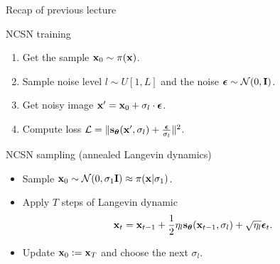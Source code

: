 \begin{frame}{Recap of previous lecture}
	\begin{block}{NCSN training}
		\begin{enumerate}
			\item Get the sample $\mathbf{x}_0 \sim \pi(\mathbf{x})$.
			\item Sample noise level $l \sim U[1, L]$ and the noise $\boldsymbol{\epsilon} \sim \mathcal{N}(0, \mathbf{I})$.
			\item Get noisy image $\mathbf{x}' = \mathbf{x}_0 + \sigma_l \cdot \boldsymbol{\epsilon}$.
			\item Compute loss $ \mathcal{L} = \| \mathbf{s}_{\boldsymbol{\theta}}(\mathbf{x}', \sigma_l) + \frac{\boldsymbol{\epsilon}}{\sigma_l} \|^2 $.
		\end{enumerate}
	\end{block}
	\begin{block}{NCSN sampling (annealed Langevin dynamics)}
		\begin{itemize}
			\item Sample $\mathbf{x}_0 \sim \mathcal{N}(0, \sigma_1 \mathbf{I}) \approx \pi(\mathbf{x} | \sigma_1)$.
			\item Apply $T$ steps of Langevin dynamic
			\vspace{-0.2cm}
			\[
				\mathbf{x}_t = \mathbf{x}_{t-1} + \frac{1}{2}\eta_l \mathbf{s}_{\boldsymbol{\theta}}(\mathbf{x}_{t - 1}, \sigma_l) + \sqrt{\eta_l} \boldsymbol{\epsilon}_t.
			\] 
			\vspace{-0.5cm}
			\item Update $\mathbf{x}_0 := \mathbf{x}_T$ and choose the next $\sigma_l$.
		\end{itemize}
	\end{block}
\end{frame}
